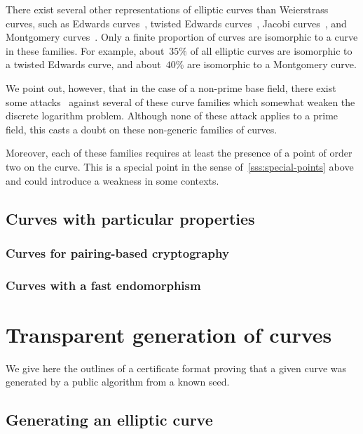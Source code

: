 \documentclass{article}
\begin{document}
There exist several other representations of elliptic curves
than Weierstrass curves, such as
Edwards curves~\cite{ams2007edwards},
twisted Edwards curves~\cite{africa2008bbjl},
Jacobi curves~\cite{aaaaec2003bj},
and Montgomery curves~\cite{mathcomp1987montgomery}.
Only a finite proportion of curves are isomorphic
to a curve in these families.
For example, about~$35\%$ of all elliptic curves
are isomorphic to a twisted Edwards curve,
and about~$40\%$ are isomorphic to a Montgomery curve.

We point out, however, that in the case of a non-prime base field,
there exist some attacks~\cite{jcrypto2014fghr}
against several of these curve families
which somewhat weaken the discrete logarithm problem.
Although none of these attack applies to a prime field,
this casts a doubt on these non-generic families of curves.

Moreover, each of these families requires at least
the presence of a point of order two on the curve.
This is a special point in the sense of~\ref{sss:special-points} above
and could introduce a weakness in some contexts.

\subsection{Curves with particular properties}
\label{ss:particular}

\subsubsection{Curves for pairing-based cryptography}

\subsubsection{Curves with a fast endomorphism}


\section{Transparent generation of curves}
\label{s:certif}

We give here the outlines of a certificate format
proving that a given curve was generated by a public algorithm
from a known seed.

\subsection{Generating an elliptic curve}
\end{document}
